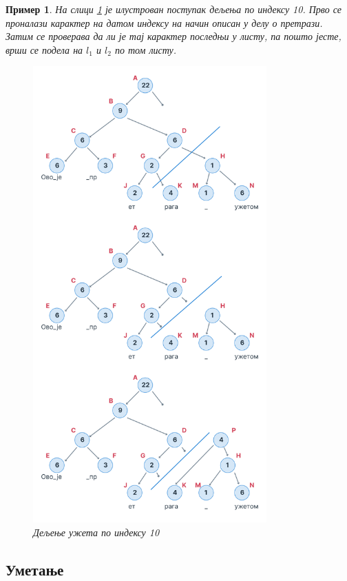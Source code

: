 \documentclass[12pt,oneside]{memoir}
\newtheorem{exmp}{Пример}
\begin{document}
\begin{exmp}
На слици \ref{fig:ropе_split} је 
илустрован поступак дељења по индексу 10. Прво се проналази карактер на датом индексу на
начин описан у делу о претрази. Затим се проверава да ли је тај карактер последњи у листу,
па пошто јесте, врши се подела на \(l_1\) и \(l_2\) по том листу.

\begin{figure}
  \centering
  \includegraphics[width=0.8\textwidth]{images/rope_split_1.png}
  \caption{Дељење ужета по индексу 10}
  \label{fig:ropе_split}
\end{figure} 
\end{exmp}

\subsection{Уметање}
\end{document}
